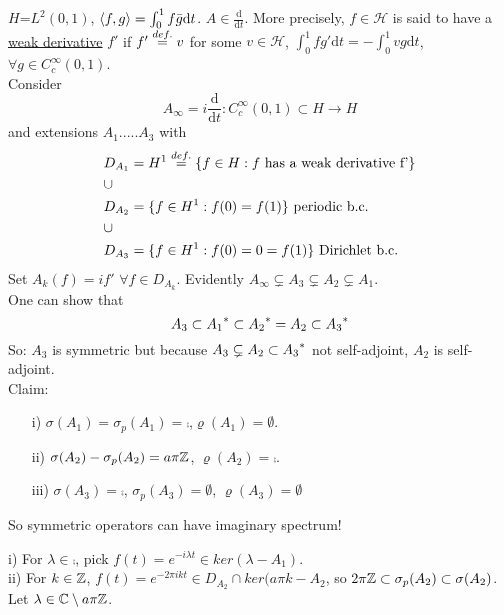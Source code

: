 \documentclass{article}
\begin{document}
\begin{example}\nl
	$H$=$L^2(0,1)$, $\left<{f},{g}\right>=\int_0^1f\bar{g} \mathrm{d}t$. $A\in\frac{\mathrm{d}}{\mathrm{d}t}$. More precisely, $f\in\mathcal{H}$ is said to have a \underline{weak derivative} $f'$ if $f'\stackrel{def.}{=}{v}$ for some $v\in \mathcal{H}$, $\int_0^1 fg'\mathrm{d}t=-\int_0^1 vg\mathrm{d}t$, $\forall g\in C^\infty_c(0,1)$.\\
	Consider
	$$
		A_\infty =i\frac{\mathrm{d}}{\mathrm{d}t}:C^\infty_c(0,1)\subset H\to H
	$$
	and extensions $A_1$.....$A_3$ with
	\begin{equation}
		\begin{aligned}
			 & D_{A_1}=H^1\stackrel{def.}{=}\{f\in H: f \text{ has a weak derivative  f'}\} \\
			 & \cup                                                            \\
			 & D_{A_2}=\{f\in H^1:f(0)=f(1)\}\text{ periodic b.c.}             \\
			 & \cup                                                            \\
			 & D_{A_3}=\{f\in H^1: f(0)=0=f(1)\}\text{ Dirichlet b.c.}         \\
		\end{aligned}
	\end{equation}
	Set $A_k(f)=if'\,\,\forall f\in D_{A_k}$. Evidently $ A_\infty\subsetneq A_3\subsetneq A_2 \subsetneq A_1$.\\
	One can show that
	$$
		A_3\subset{A_1}^*\subset{A_2}^*=A_2\subset{A_3}^*
	$$
	So: $A_3$ is symmetric but because $A_3\subsetneq A_2\subset {A_3}^*$ not self-adjoint, $A_2$ is self-adjoint.\\
	Claim:
	\begin{itemize}
		\item [i)] $\sigma(A_1)=\sigma_p(A_1)=\comp$,$ \varrho(A_1)=\emptyset$.
		\item [ii)] $\sigma(A_2)-\sigma_p(A_2)=a\pi\mathbb{Z}$, $\varrho(A_2)=\comp$.
		\item [iii)] $\sigma(A_3)=\comp$, $\sigma_p(A_3)=\emptyset$, $\varrho(A_3)=\emptyset$
	\end{itemize}
	So symmetric operators can have imaginary spectrum!
	\begin{pf}{}{}
		i) For $\lambda\in\comp$, pick $f(t)=e^{-i\lambda t}\in ker(\lambda-A_1)$.\\
		ii) For $k\in\mathbb{Z}$, $f(t)=e^{-2\pi ikt}\in D_{A_2}\cap ker(a\pi k-A_2$,
		so $2\pi \mathbb{Z}\subset \sigma_p(A_2)\subset\sigma(A_2)$.
		Let $\lambda\in\mathbb{C}\setminus a\pi\mathbb{Z}$.

\end{pf}
\end{example}
\end{document}

